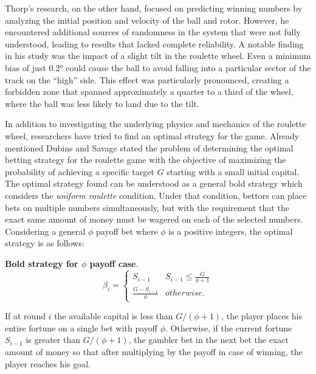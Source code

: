 \documentclass[11pt,twoside]{article}
\numberwithin{Theorem}{section}
\numberwithin{Definition}{section}
\numberwithin{Lemma}{section}
\numberwithin{Algorithm}{section}
\numberwithin{equation}{section}
\begin{document}
Thorp's research\cite{Thorp}, on the other hand, focused on predicting winning numbers by analyzing the initial position and velocity of the ball and rotor. However, he encountered additional sources of randomness in the system that were not fully understood, leading to results that lacked complete reliability. A notable finding in his study was the impact of a slight tilt in the roulette wheel. Even a minimum bias of just 0.2° could cause the ball to avoid falling into a particular sector of the track on the “high” side. This effect was particularly pronounced, creating a forbidden zone that spanned approximately a quarter to a third of the wheel, where the ball was less likely to land due to the tilt.

In addition to investigating the underlying physics and mechanics of the roulette wheel, researchers have tried to find an optimal strategy for the game. Already mentioned Dubins and Savage \cite{Dubins} stated the problem of determining the optimal betting strategy for the roulette game with the objective of maximizing the probability of achieving a specific target $G$ starting with a small initial capital. The optimal strategy found can be understood as a general bold strategy which considers the \textit{uniform roulette} condition. Under that condition, bettors can place bets on multiple numbers simultaneously, but with the requirement that the exact same amount of money must be wagered on each of the selected numbers. 
Considering a general $\phi$ payoff bet where $\phi$ is a positive integers, the optimal strategy is as follows:

 \begin{tcolorbox}[colback=gray!10,boxrule=0.25pt]
\textbf{Bold strategy for $\phi$ payoff case}.\\
\begin{equation*}
\beta_{i} = \left\{
\begin{array}{ll}
 S_{i-1}&  S_{i-1} \leq \frac{G}{\phi+1}\\
\frac{G-S_{i-1}}{\phi} & otherwise.
\end{array}
\right.
\end{equation*}
\end{tcolorbox}

If at round $i$ the available capital is less than $G/(\phi+1)$, the player places his entire fortune on a single bet with payoff $\phi$. Otherwise, if the current fortune $S_{i-1}$ is greater than $G/(\phi+1)$, the gambler bet in the next bet the exact amount of money so that after multiplying by the payoff in case of winning, the player reaches his goal.
\end{document}

